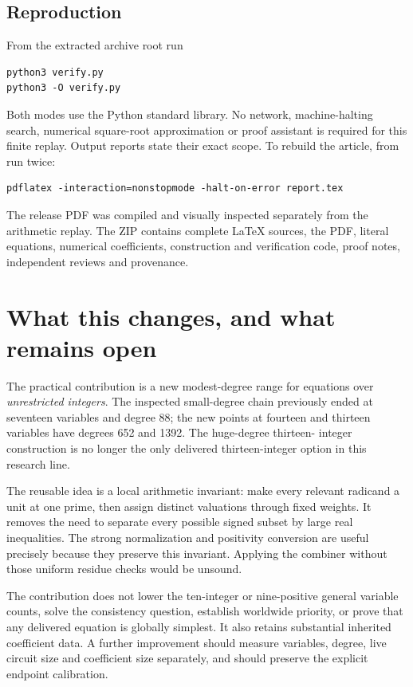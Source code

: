 \documentclass[11pt]{article}
\theoremstyle{remark}\newtheorem{remark}[theorem]{Remark}
\newcommand{\file}[1]{\path{#1}}
\begin{document}
\subsection{Reproduction}
From the extracted archive root run
\begin{verbatim}
python3 verify.py
python3 -O verify.py
\end{verbatim}
Both modes use the Python standard library. No network, machine-halting
search, numerical square-root approximation or proof assistant is required
for this finite replay. Output reports state their exact scope.
To rebuild the article, from \file{report/} run twice:
\begin{verbatim}
pdflatex -interaction=nonstopmode -halt-on-error report.tex
\end{verbatim}
The release PDF was compiled and visually inspected separately from the
arithmetic replay. The ZIP contains complete LaTeX sources, the PDF, literal
equations, numerical coefficients, construction and verification code, proof
notes, independent reviews and provenance.

\section{What this changes, and what remains open}
The practical contribution is a new modest-degree range for equations over
\emph{unrestricted integers}. The inspected small-degree chain previously
ended at seventeen variables and degree 88; the new points at fourteen and
thirteen variables have degrees 652 and 1392. The huge-degree thirteen-
integer construction is no longer the only delivered thirteen-integer
option in this research line.

The reusable idea is a local arithmetic invariant: make every relevant
radicand a unit at one prime, then assign distinct valuations through fixed
weights. It removes the need to separate every possible signed subset by
large real inequalities. The strong normalization and positivity conversion
are useful precisely because they preserve this invariant. Applying the
combiner without those uniform residue checks would be unsound.

The contribution does not lower the ten-integer or nine-positive general
variable counts, solve the consistency question, establish worldwide
priority, or prove that any delivered equation is globally simplest. It
also retains substantial inherited coefficient data. A further improvement
should measure variables, degree, live circuit size and coefficient size
separately, and should preserve the explicit endpoint calibration.
\end{document}
